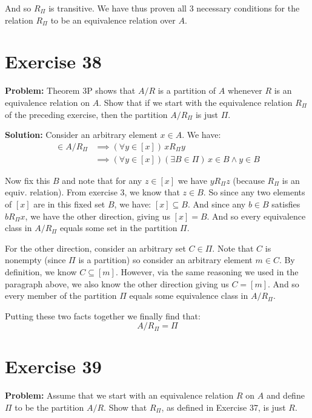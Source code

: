 \documentclass{article}
\begin{document}
And so $R_\Pi$ is transitive. We have thus proven all 3 necessary conditions for the relation $R_\Pi$ to be an equivalence relation over $A$.

\section*{Exercise 38}
\noindent\textbf{Problem:} Theorem 3P shows that $A/R$ is a partition of $A$ whenever $R$ is an equivalence relation on $A$. Show that if we start with the equivalence relation $R_\Pi$ of the preceding
exercise, then the partition $A/R_\Pi$ is just $\Pi$.
\bigskip

\noindent\textbf{Solution:} Consider an arbitrary element $x\in A$. We have:
\begin{align*}
    [x]\in A/R_\Pi&\implies(\forall y\in[x])\,xR_\Pi y\\
    &\implies(\forall y\in[x])(\exists B\in\Pi)\,x\in B\wedge y\in B
\end{align*}

Now fix this $B$ and note that for any $z\in[x]$ we have $yR_\Pi z$ (because $R_\Pi$ is an equiv. relation). From exercise 3, we know that $z\in B$. So since any two elements of $[x]$ are in this fixed set $B$, we have: $[x]\subseteq B$. And since any $b\in B$ satisfies $bR_\Pi x$, we have the other direction, giving us $[x]=B$. And so every equivalence class in $A/R_\Pi$ equals some set in the partition $\Pi$.

For the other direction, consider an arbitrary set $C\in\Pi$. Note that $C$ is nonempty (since $\Pi$ is a partition) so consider an arbitrary element $m\in C$. By definition, we know $C\subseteq [m]$. However, via the same reasoning we used in the paragraph above, we also know the other direction giving us $C=[m]$. And so every member of the partition $\Pi$ equals some equivalence class in $A/R_\Pi$.

Putting these two facts together we finally find that:
\begin{equation*}
    A/R_\Pi=\Pi
\end{equation*}

\section*{Exercise 39}
\noindent\textbf{Problem:} Assume that we start with an equivalence relation $R$ on $A$ and define $\Pi$ to be the partition $A/R$. Show that $R_\Pi$, as defined in Exercise 37, is just $R$.
\bigskip
\end{document}
